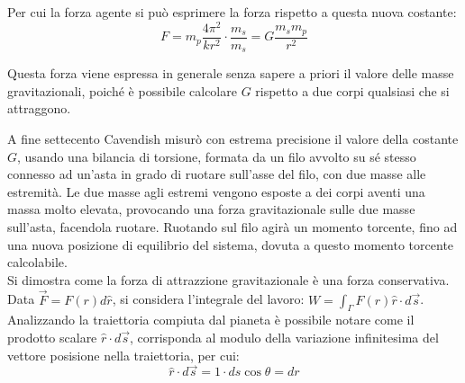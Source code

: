 \documentclass{article}
\numberwithin{equation}{subsection}
\begin{document}
Per cui la forza agente si può esprimere la forza rispetto a questa nuova costante:
\begin{equation}
    F=m_p\displaystyle\frac{4\pi^2}{kr^2}\cdot\frac{m_s}{m_s}=G\frac{m_sm_p}{r^2}
\end{equation}

Questa forza viene espressa in generale senza sapere a priori il valore delle masse gravitazionali, poiché è possibile calcolare $G$ rispetto a due 
corpi qualsiasi che si attraggono. 



A fine settecento Cavendish misurò con estrema precisione il valore della costante $G$, usando una bilancia di torsione, formata da un filo avvolto 
su sé stesso connesso ad un'asta in grado di ruotare sull'asse del filo, con due masse alle estremità. Le due masse agli estremi vengono esposte 
a dei corpi aventi una massa molto elevata, provocando una forza gravitazionale sulle due masse sull'asta, facendola ruotare. Ruotando sul filo 
agirà un momento torcente, fino ad una nuova posizione di equilibrio del sistema, dovuta a questo momento torcente calcolabile.\\

Si dimostra come la forza di attrazzione gravitazionale è una forza conservativa. \\
Data $\vec{F}=F(r)d\hat{r}$, si considera l'integrale del lavoro: $W=\displaystyle\int_{\Gamma}F(r)\hat{r}\cdot d\vec{s}$. Analizzando  
la traiettoria compiuta dal pianeta è possibile notare come il prodotto scalare $\hat{r}\cdot d\vec{s}$, corrisponda al modulo della variazione 
infinitesima del vettore posisione nella traiettoria, per cui:
\begin{equation*}
    \hat{r}\cdot d\vec{s}=1\cdot ds\cos\theta=dr
\end{equation*}

\begin{center}
\end{center}
\end{document}
